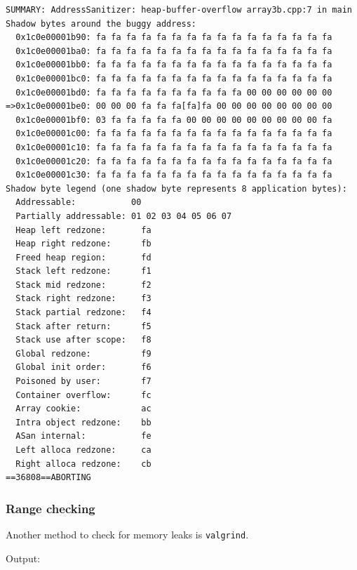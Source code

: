 \documentclass[12pt,letterpaper,twoside]{article}
\begin{document}
\begin{verbatim}
SUMMARY: AddressSanitizer: heap-buffer-overflow array3b.cpp:7 in main
Shadow bytes around the buggy address:
  0x1c0e00001b90: fa fa fa fa fa fa fa fa fa fa fa fa fa fa fa fa
  0x1c0e00001ba0: fa fa fa fa fa fa fa fa fa fa fa fa fa fa fa fa
  0x1c0e00001bb0: fa fa fa fa fa fa fa fa fa fa fa fa fa fa fa fa
  0x1c0e00001bc0: fa fa fa fa fa fa fa fa fa fa fa fa fa fa fa fa
  0x1c0e00001bd0: fa fa fa fa fa fa fa fa fa fa 00 00 00 00 00 00
=>0x1c0e00001be0: 00 00 00 fa fa fa[fa]fa 00 00 00 00 00 00 00 00
  0x1c0e00001bf0: 03 fa fa fa fa fa 00 00 00 00 00 00 00 00 00 fa
  0x1c0e00001c00: fa fa fa fa fa fa fa fa fa fa fa fa fa fa fa fa
  0x1c0e00001c10: fa fa fa fa fa fa fa fa fa fa fa fa fa fa fa fa
  0x1c0e00001c20: fa fa fa fa fa fa fa fa fa fa fa fa fa fa fa fa
  0x1c0e00001c30: fa fa fa fa fa fa fa fa fa fa fa fa fa fa fa fa
Shadow byte legend (one shadow byte represents 8 application bytes):
  Addressable:           00
  Partially addressable: 01 02 03 04 05 06 07 
  Heap left redzone:       fa
  Heap right redzone:      fb
  Freed heap region:       fd
  Stack left redzone:      f1
  Stack mid redzone:       f2
  Stack right redzone:     f3
  Stack partial redzone:   f4
  Stack after return:      f5
  Stack use after scope:   f8
  Global redzone:          f9
  Global init order:       f6
  Poisoned by user:        f7
  Container overflow:      fc
  Array cookie:            ac
  Intra object redzone:    bb
  ASan internal:           fe
  Left alloca redzone:     ca
  Right alloca redzone:    cb
==36808==ABORTING
\end{verbatim}

\hypertarget{range-checking-2}{%
\subsubsection{Range checking}\label{range-checking-2}}

Another method to check for memory leaks is \texttt{valgrind}.

Output:
\end{document}
